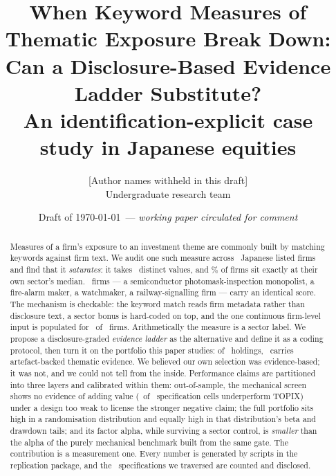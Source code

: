 \documentclass[a4paper,11pt]{article}
\title{\textbf{When Keyword Measures of Thematic Exposure Break Down:\\
Can a Disclosure-Based Evidence Ladder Substitute?}\\[2mm]
\large An identification-explicit case study in Japanese equities}
\author{[Author names withheld in this draft]\\\small Undergraduate research team}
\date{Draft of \today\ --- \emph{working paper circulated for comment}}
\begin{document}
\maketitle

\begin{abstract}
\noindent Measures of a firm's exposure to an investment theme are commonly built by matching keywords
against firm text. We audit one such measure across \SatFirms\ Japanese listed firms and find that it
\emph{saturates}: it takes \SatDistinct\ distinct values, and \SatSectorShare\% of firms sit exactly at
their own sector's median. \SatTieN\ firms --- a semiconductor photomask-inspection monopolist, a
fire-alarm maker, a watchmaker, a railway-signalling firm --- carry an identical score. The mechanism
is checkable: the keyword match reads firm metadata rather than disclosure text, a sector bonus is
hard-coded on top, and the one continuous firm-level input is populated for \SatRdPresent\ of
\SatFirms\ firms. Arithmetically the measure is a sector label. We propose a disclosure-graded
\emph{evidence ladder} as the alternative and define it as a coding protocol, then turn it on the
portfolio this paper studies: of \OwnHoldings\ holdings, \OwnVerified\ carries artefact-backed thematic
evidence. We believed our own selection was evidence-based; it was not, and we could not tell from the
inside. Performance claims are partitioned into three layers and calibrated within them: out-of-sample,
the mechanical screen shows no evidence of adding value (\LoneNegative\ of \LoneCells\ specification
cells underperform TOPIX) under a design too weak to license the stronger negative claim; the full
portfolio sits high in a randomisation distribution and equally high in that distribution's beta and
drawdown tails; and its factor alpha, while surviving a sector control, is \emph{smaller} than the
alpha of the purely mechanical benchmark built from the same gate. The contribution is a measurement
one. Every number is generated by scripts in the replication package, and the \SpecTotal\ specifications
we traversed are counted and disclosed.
\end{abstract}

\medskip
\noindent{}
\end{document}

